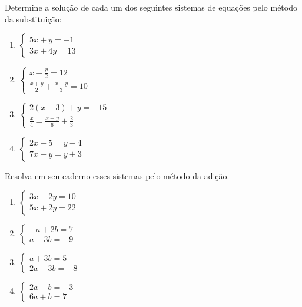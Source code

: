 	\item Determine a solução de cada um dos seguintes sistemas de equações pelo método da substituição:
	\begin{multicols}{2}	
	\begin{enumerate}
		\item $\begin{cases}5x+y=-1\\ 3x+4y=13\end{cases}$
		\item $\begin{cases}	x+\displaystyle\frac{y}{2}=12\\ \displaystyle\frac{x+y}{2}+\frac{x-y}{3}=10\end{cases}$
		\item $\begin{cases}2(x-3)+y=-15\\ \displaystyle\frac{x}{4}=\frac{x+y}{6}+\frac{2}{3}\end{cases}$
		\item $\begin{cases}2x-5=y-4\\ 7x-y=y+3\end{cases}$	
	\end{enumerate}
	\end{multicols}
	
	\item Resolva em seu caderno esses sistemas pelo método da adição.
	\begin{multicols}{2}
	\begin{enumerate}
		\item $\begin{cases} 3x-2y=10\\ 5x+2y=22 \end{cases}$
		\item $\begin{cases}-a+2b=7\\ a-3b=-9\end{cases}$
		\item $\begin{cases}a+3b=5\\ 2a-3b=-8\end{cases}$
		\item $\begin{cases}2a-b=-3\\ 6a+b=7\end{cases}$
	\end{enumerate}
	\end{multicols}
	

